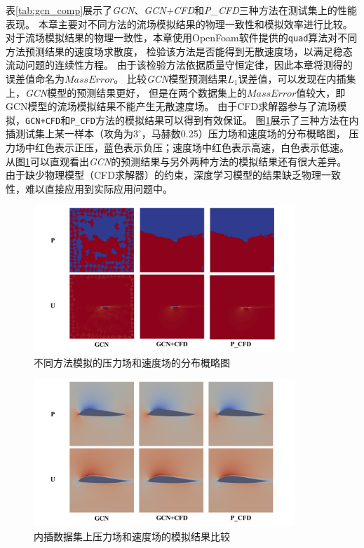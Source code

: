 表\ref{tab:gcn_comp}展示了\textit{GCN}、\textit{GCN+CFD}和\textit{P\_CFD}三种方法在测试集上的性能表现。
本章主要对不同方法的流场模拟结果的物理一致性和模拟效率进行比较。
对于流场模拟结果的物理一致性，本章使用OpenFoam软件提供的\texttt{quad}算法对不同方法预测结果的速度场求散度，
检验该方法是否能得到无散速度场，以满足稳态流动问题的连续性方程。
由于该检验方法依据质量守恒定律，因此本章将测得的误差值命名为$Mass Error$。
比较\textit{GCN}模型预测结果$L_1$误差值，可以发现在内插集上，\textit{GCN}模型的预测结果更好，
但是在两个数据集上的$Mass Error$值较大，即GCN模型的流场模拟结果不能产生无散速度场。
由于CFD求解器参与了流场模拟，\texttt{GCN+CFD}和\texttt{P\_CFD}方法的模拟结果可以得到有效保证。
图\ref{fig:show}展示了三种方法在内插测试集上某一样本（攻角为$3^{\circ}$，马赫数0.25）压力场和速度场的分布概略图，
压力场中红色表示正压，蓝色表示负压；速度场中红色表示高速，白色表示低速。
从图\ref{fig:show}可以直观看出\textit{GCN}的预测结果与另外两种方法的模拟结果还有很大差异。
由于缺少物理模型（CFD求解器）的约束，深度学习模型的结果缺乏物理一致性，难以直接应用到实际应用问题中。


\begin{figure}[htp]
	\centering
	\includegraphics[width=0.88\textwidth]{figures/gcn_result/chapter4/show.png}
	\caption{不同方法模拟的压力场和速度场的分布概略图}
	\label{fig:show}
\end{figure}


\begin{figure}[htp]
	\centering
	\includegraphics[width=0.88\textwidth]{figures/gcn_result/chapter4/gcncomp.png}
	\caption{内插数据集上压力场和速度场的模拟结果比较}
	\label{fig:interresult}
\end{figure}

